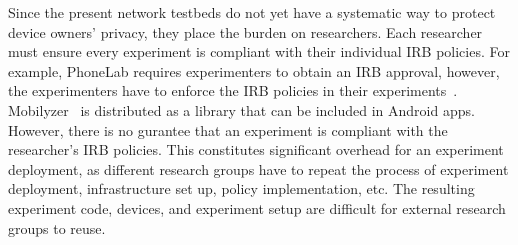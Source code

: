 Since the present network testbeds do not yet have a systematic 
way to protect device owners' privacy, they place 
the burden on researchers. Each researcher must ensure every 
experiment is compliant with their individual IRB policies.
For example, PhoneLab requires experimenters to 
obtain an IRB approval, however, the experimenters have 
to enforce the IRB policies in their 
experiments~\cite{nandugudi2013phonelab}. 
Mobilyzer~\cite{nikravesh2015mobilyzer} is distributed 
as a library that can be included in Android apps. 
However, there is no gurantee that an 
experiment is compliant with the researcher's IRB policies.
This constitutes significant overhead for an experiment 
deployment, as different research groups have to repeat 
the process of experiment deployment, infrastructure 
set up, policy implementation, etc. The resulting 
experiment code, devices, and experiment setup are 
difficult for external research groups to reuse.




